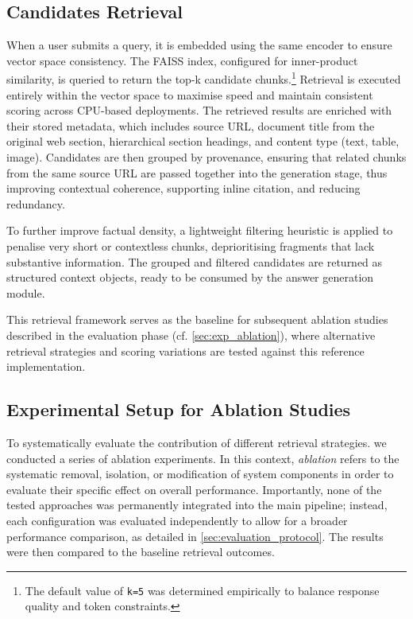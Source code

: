 \begin{spacing}{1.5}
\section{Candidates Retrieval}
When a user submits a query, it is embedded using the same encoder to ensure vector space consistency. The FAISS index, configured for inner-product similarity, is queried to return the top-k candidate chunks.\footnote{The default value of \texttt{k=5} was determined empirically to balance response quality and token constraints.} Retrieval is executed entirely within the vector space to maximise speed and maintain consistent scoring across CPU-based deployments. The retrieved results are enriched with their stored metadata, which includes source URL, document title from the original web section, hierarchical section headings, and content type (text, table, image). Candidates are then grouped by provenance, ensuring that related chunks from the same source URL are passed together into the generation stage, thus improving contextual coherence, supporting inline citation, and reducing redundancy.

To further improve factual density, a lightweight filtering heuristic is applied to penalise very short or contextless chunks, deprioritising fragments that lack substantive information. The grouped and filtered candidates are returned as structured context objects, ready to be consumed by the answer generation module. 

This retrieval framework serves as the baseline for subsequent ablation studies described in the evaluation phase (cf. \autoref{sec:exp_ablation}), where alternative retrieval strategies and scoring variations are tested against this reference implementation.

\subsection{Experimental Setup for Ablation Studies}\label{sec:exp_ablation}
To systematically evaluate the contribution of different retrieval strategies. we conducted a series of ablation experiments. In this context, \textit{ablation} refers to the systematic removal, isolation, or modification of system components in order to evaluate their specific effect on overall performance. Importantly, none of the tested approaches was permanently integrated into the main pipeline; instead, each configuration was evaluated independently to allow for a broader performance comparison, as detailed in \autoref{sec:evaluation_protocol}. The results were then compared to the baseline retrieval outcomes.


\end{spacing}
